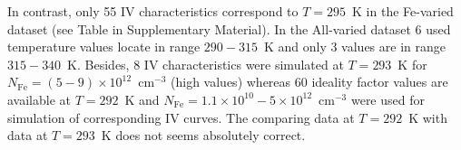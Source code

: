 \documentclass[num-refs]{wiley-article} %
\begin{document}
In contrast, only 55 IV characteristics correspond to $T=295$~K in the Fe-varied dataset
(see Table in Supplementary Material).
In the All-varied dataset 6 used temperature values locate in range $290-315$~K and only 3 values are in range $315-340$~K.
Besides, 8 IV characteristics were simulated at $T=293$~K for $N_\mathrm{Fe}=(5-9)\times10^{12}$~cm$^{-3}$
(high values)
whereas 60 ideality factor values are available at $T=292$~K
and $N_\mathrm{Fe}=1.1\times10^{10}-5\times10^{12}$~cm$^{-3}$ were used for
simulation of corresponding IV curves.
The comparing data at $T=292$~K with data at $T=293$~K does not seems absolutely correct.




%


\end{document}
